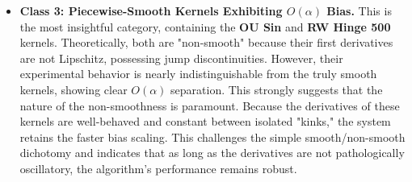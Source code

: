 \documentclass[a4paper]{article}
\begin{document}
\begin{itemize}
\begin{itemize}
		\item \textbf{Class 3: Piecewise-Smooth Kernels Exhibiting \(O(\alpha)\) Bias.} This is the most insightful category, containing the \textbf{OU Sin} and \textbf{RW Hinge 500} kernels. Theoretically, both are "non-smooth" because their first derivatives are not Lipschitz, possessing jump discontinuities. However, their experimental behavior is nearly indistinguishable from the truly smooth kernels, showing clear \(O(\alpha)\) separation. This strongly suggests that the nature of the non-smoothness is paramount. Because the derivatives of these kernels are well-behaved and constant between isolated "kinks," the system retains the faster bias scaling. This challenges the simple smooth/non-smooth dichotomy and indicates that as long as the derivatives are not pathologically oscillatory, the algorithm's performance remains robust.
	\end{itemize}
\end{itemize}
	 
	
	
	
\end{document}
